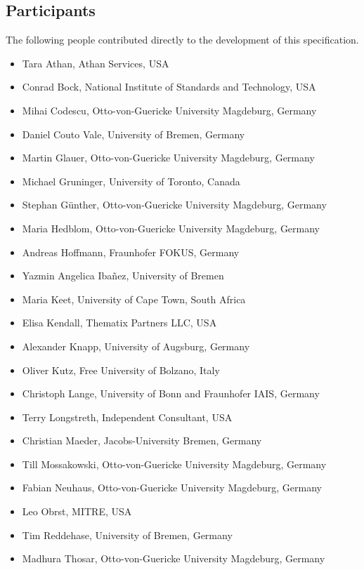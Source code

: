 \documentclass[10pt,fleqn,%
\ifpretendfinal
final%
\else
draft%
\fi,
]{scrreprt}
\begin{document}
\subsection{Participants}
The following people contributed directly to the development of this specification. 
	\begin{itemize}
	\item Tara Athan, Athan Services, USA 
	\item Conrad Bock, National Institute of Standards and Technology, USA
	\item Mihai Codescu, Otto-von-Guericke University Magdeburg, Germany 
        \item Daniel Couto Vale, University of Bremen, Germany
        \item Martin Glauer, Otto-von-Guericke University Magdeburg, Germany
	\item Michael Gruninger, University of Toronto, Canada  
        \item Stephan Günther, Otto-von-Guericke University Magdeburg, Germany
        \item Maria Hedblom, Otto-von-Guericke University Magdeburg, Germany
	\item Andreas Hoffmann, Fraunhofer FOKUS, Germany 
        \item Yazmin Angelica Iba\~nez, University of Bremen
	\item Maria Keet, University of Cape Town, South Africa 
	\item Elisa Kendall, Thematix Partners LLC, USA	
        \item Alexander Knapp, University of Augsburg, Germany
	\item Oliver Kutz, Free University of Bolzano, Italy
	\item Christoph Lange, University of Bonn and Fraunhofer IAIS, Germany
	\item Terry Longstreth, Independent Consultant, USA 	
        \item Christian Maeder, Jacobs-University Bremen, Germany
	\item Till Mossakowski, Otto-von-Guericke University Magdeburg, Germany  	
	\item Fabian Neuhaus, Otto-von-Guericke University Magdeburg, Germany  	  
	\item Leo Obrst, MITRE, USA
        \item Tim Reddehase, University of Bremen, Germany
        \item Madhura Thosar, Otto-von-Guericke University Magdeburg, Germany
   
	\end{itemize}
%	
\end{document}

